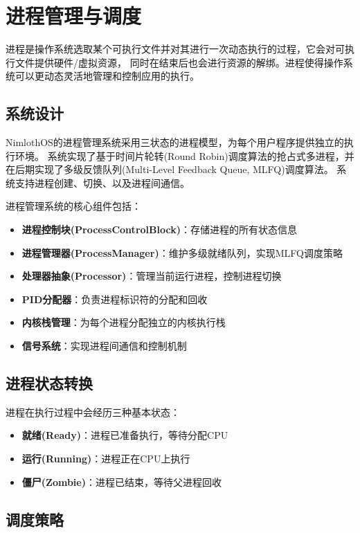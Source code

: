 \chapter{进程管理与调度}

进程是操作系统选取某个可执行文件并对其进行一次动态执行的过程，它会对可执行文件提供硬件/虚拟资源，
同时在结束后也会进行资源的解绑。进程使得操作系统可以更动态灵活地管理和控制应用的执行。

\section{系统设计}

NimlothOS的进程管理系统采用三状态的进程模型，为每个用户程序提供独立的执行环境。
系统实现了基于时间片轮转(Round Robin)调度算法的抢占式多进程，并在后期实现了多级反馈队列(Multi-Level Feedback Queue, MLFQ)调度算法。
系统支持进程创建、切换、以及进程间通信。

进程管理系统的核心组件包括：

\begin{itemize}
    \item \textbf{进程控制块(ProcessControlBlock)}：存储进程的所有状态信息
    \item \textbf{进程管理器(ProcessManager)}：维护多级就绪队列，实现MLFQ调度策略
    \item \textbf{处理器抽象(Processor)}：管理当前运行进程，控制进程切换
    \item \textbf{PID分配器}：负责进程标识符的分配和回收
    \item \textbf{内核栈管理}：为每个进程分配独立的内核执行栈
    \item \textbf{信号系统}：实现进程间通信和控制机制
\end{itemize}

\section{进程状态转换}

进程在执行过程中会经历三种基本状态：

\begin{itemize}
    \item \textbf{就绪(Ready)}：进程已准备执行，等待分配CPU
    \item \textbf{运行(Running)}：进程正在CPU上执行
    \item \textbf{僵尸(Zombie)}：进程已结束，等待父进程回收
\end{itemize}

\section{调度策略}

